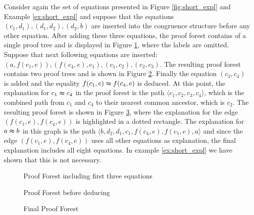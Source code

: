 \begin{example}

Consider again the set of equations presented in Figure \ref{fig:short_expl} and Example \ref{ex:short_expl} and suppose that the equations $(c_1,d_1),(d_1,d_2),(d_2,b)$ are inserted into the congruence structure before any other equation.
After adding these three equations, the proof forest contains of a single proof tree and is displayed in Figure \ref{fig:proof_forest_1}, where the labels are omitted.
Suppose that next following equations are inserted: $(a,f(c_1,e)),(f(c_4,e),c_1),(c_1,c_2),(c_2,c_3)$.
The resulting proof forest contains two proof trees and is shown in Figure \ref{fig:proof_forest_2}.
Finally the equation $(c_3,c_4)$ is added and the equality $f(c_1,e) \thickapprox f(c_4,e)$ is deduced.
At this point, the explanation for $c_1 \thickapprox c_4$ in the proof forest is the path $\langle c_1,c_2,c_3,c_4 \rangle$, which is the combined path from $c_1$ and $c_4$ to their nearest common ancestor, which is $c_2$.
The resulting proof forest is shown in Figure \ref{fig:proof_forest_3}, where the explanation for the edge $(f(c_1,e),f(c_4,e))$ is highlighted in a dotted rectangle.
The explanation for $a \thickapprox b$ in this graph is the path $\langle b,d_2,d_1,c_1,f(c_4,e),f(c_1,e),a\rangle$ and since the edge $(f(c_1,e),f(c_4,e))$ uses all other equations as explanation, the final explanation includes all eight equations.
In example \ref{ex:short_expl} we have shown that this is not necessary.

\begin{figure}[!h]

\caption{Proof Forest including first three equations}
\label{fig:proof_forest_1}
\end{figure}

\begin{figure}[!h]

\caption{Proof Forest before deducing}
\label{fig:proof_forest_2}
\end{figure}

\begin{figure}[!h]

\caption{Final Proof Forest}
\label{fig:proof_forest_3}
\end{figure}

\end{example}



\FloatBarrier